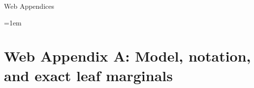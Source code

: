 \documentclass[11pt]{article}
\theoremstyle{definition}
\theoremstyle{plain}
\begin{document}


\clearpage
\appendix
\begin{center}{\Large Web Appendices}\end{center}
{\emergencystretch=1em
%

\newtheorem{thmA}{Theorem}
\renewcommand{\thethmA}{A\arabic{thmA}}
\newtheorem{lemA}{Lemma}
\renewcommand{\thelemA}{A\arabic{lemA}}
\newtheorem{propA}{Proposition}
\renewcommand{\thepropA}{A\arabic{propA}}
\newtheorem{corA}{Corollary}
\renewcommand{\thecorA}{A\arabic{corA}}
\theoremstyle{definition}
\newtheorem{assA}{Assumption}
\renewcommand{\theassA}{A\arabic{assA}}
\newtheorem{remA}{Remark}
\renewcommand{\theremA}{A\arabic{remA}}
\theoremstyle{plain}
\renewcommand{\theequation}{A\arabic{equation}}
\newcommand{\Pspike}{P_{\mathrm{spike}}}
\newcommand{\ess}{\mathrm{ESS}}
\newcommand{\Phibar}{\bar\Phi}
\newcommand{\tr}{^{\top}}

\section*{Web Appendix A: Model, notation, and exact leaf marginals}

}
\end{document}
